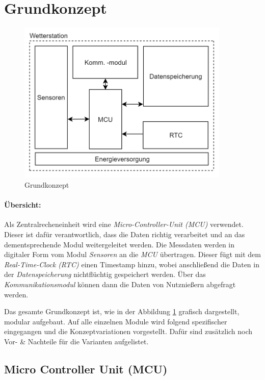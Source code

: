 \section{Grundkonzept}
\label{chap:grundkonzept}
\begin{figure}[h]
	\centering
	\includegraphics[width=0.9\textwidth]{graphics/Grundkonzept.PNG}
	\caption{Grundkonzept}
	\label{fig:grundkonzept}
\end{figure}

\paragraph{Übersicht:}
Als Zentralrecheneinheit wird eine \textit{Micro-Controller-Unit (MCU)} verwendet. Dieser ist dafür verantwortlich, dass die Daten richtig verarbeitet und an das dementsprechende Modul weitergeleitet werden. Die Messdaten werden in digitaler Form vom Modul \textit{Sensoren} an die \textit{MCU} übertragen. Dieser fügt mit dem \textit{Real-Time-Clock (RTC)} einen Timestamp hinzu, wobei anschließend die Daten in der \textit{Datenspeicherung} nichtflüchtig gespeichert werden. Über das \textit{Kommunikationsmodul} können dann die Daten von Nutznießern abgefragt werden.

Das gesamte Grundkonzept ist, wie in der Abbildung \ref{fig:grundkonzept} grafisch dargestellt, modular aufgebaut. Auf alle einzelnen Module wird folgend spezifischer eingegangen und die Konzeptvariationen vorgestellt. Dafür sind zusätzlich noch Vor- \& Nachteile für die Varianten aufgelistet.\\
\newpage

\subsection{Micro Controller Unit (MCU)}
